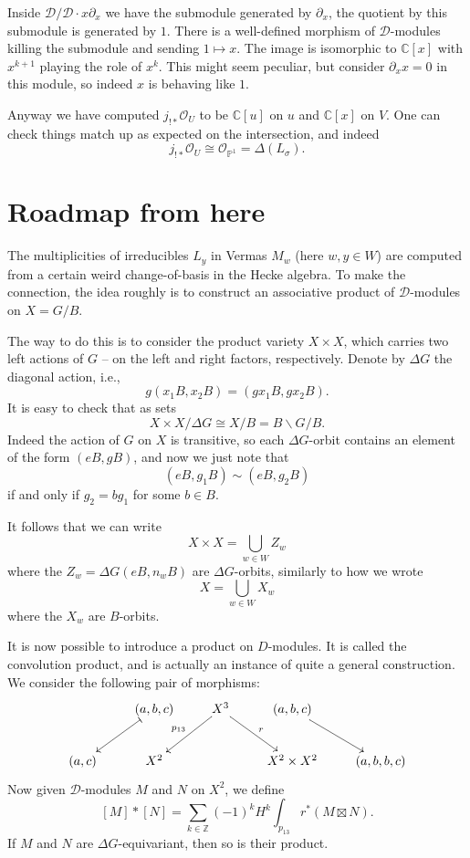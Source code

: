 \documentclass[12pt]{article}
\theoremstyle{plain}
\theoremstyle{definition}
\numberwithin{equation}{section}
\newcommand{\D}{\Delta}
\newcommand{\C}{\mathbb{C}}
\newcommand{\Z}{\mathbb{Z}}
\newcommand{\bbP}{\mathbb{P}}
\newcommand{\CD}{\mathcal{D}}
\newcommand{\OO}{\mathcal{O}}
\begin{document}
Inside $\CD / \CD \cdot x \partial_x$ we have the submodule generated by $\partial_x$, the quotient by this submodule is generated by $1$. There is a well-defined morphism of $\CD$-modules killing the submodule and sending $1 \mapsto x$. The image is isomorphic to $\C[x]$ with $x^{k+1}$ playing the role of $x^k$. This might seem peculiar, but consider $\partial_x x =0$ in this module, so indeed $x$ is behaving like $1$.

Anyway we have computed $j_{!*} \OO_U$ to be $\C[u]$ on $u$ and $\C[x]$ on $V$. One can check things match up as expected on the intersection, and indeed
\[
j_{!*} \OO_U \cong \OO_{\bbP^1} = \D(L_\sigma).
\]



\section{Roadmap from here}

\newcommand{\heckat}{\mathbb{H}}

The multiplicities of irreducibles $L_y$ in Vermas $M_w$ (here $w, y \in W$) are computed from a certain weird change-of-basis in the Hecke algebra. To make the connection, the idea roughly is to construct an associative product of $\CD$-modules on $X = G / B$.

The way to do this is to consider the product variety $X \times X$, which carries two left actions of $G$ -- on the left and right factors, respectively. Denote by $\D G$ the diagonal action, i.e.,
\[
g (x_1 B, x_2 B) = (gx_1 B, gx_2 B).
\]
It is easy to check that as sets
\[
X \times X / \D G \cong X / B = B \backslash G / B.
\]
Indeed the action of $G$ on $X$ is transitive, so each $\D G$-orbit contains an element of the form $(eB, gB)$, and now we just note that
\[
(eB, g_1B) \sim (eB, g_2B)
\]
if and only if $g_2 = b g_1$ for some $b \in B$.


It follows that we can write
\[
X \times X = \bigcup_{w \in W} Z_w
\]
where the $Z_w = \D G (eB, n_w B)$ are $\D G$-orbits, similarly to how we wrote
\[
X = \bigcup_{w \in W} X_w
\]
where the $X_w$ are $B$-orbits.

It is now possible to introduce a product on $D$-modules. It is called the convolution product, and is actually an instance of quite a general construction. We consider the following pair of morphisms:
\begin{align*}
\xymatrix{
& (a, b, c) \ar@{|->}[dl] & X^3 \ar@{->}[dl]_{p_{13}} \ar@{->}[dr]^{r} & (a, b, c) \ar@{->}[dr] \\
%
(a, c) & X^2 & & X^2 \times X^2 & (a, b, b, c) \\
}
\end{align*}
Now given $\CD$-modules $M$ and $N$ on $X^2$, we define
\[
[M] * [N] = \sum_{k \in \Z} (-1)^k H^k \int_{p_{13}} r^*(M \boxtimes N).
\]
If $M$ and $N$ are $\D G$-equivariant, then so is their product.
\end{document}
